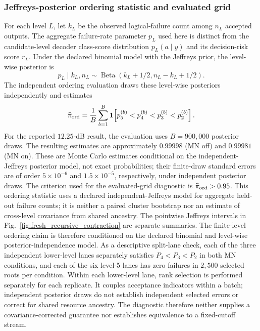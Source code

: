 \documentclass[aps,
prx,
superscriptaddress,
reprint,
longbibliography,
floatfix]{revtex4-2}
\newcounter{criterion}[section]
\begin{document}
\subsubsection{Jeffreys-posterior ordering statistic and evaluated grid}
For each level $L$, let $k_L$ be the observed logical-failure count among $n_L$ accepted outputs. The aggregate failure-rate parameter $p_L$ used here is distinct from the candidate-level decoder class-score distribution $p_L(a\mid y)$ and its decision-risk score $r_L$. Under the declared binomial model with the Jeffreys prior, the level-wise posterior is
\begin{equation}
p_L\mid k_L,n_L\sim\operatorname{Beta}(k_L+1/2,n_L-k_L+1/2).
\end{equation}
The independent ordering evaluation draws these level-wise posteriors independently and estimates
\begin{equation}
\widehat\pi_{\rm ord}=\frac{1}{B}\sum_{b=1}^{B}
\mathbf 1\!\left[p_5^{(b)}<p_4^{(b)}<p_3^{(b)}<p_2^{(b)}\right].
\end{equation}
For the reported $12.25$-dB result, the evaluation uses $B=900{,}000$ posterior draws. The resulting estimates are approximately $0.99998$ (MN off) and $0.99981$ (MN on). These are Monte Carlo estimates conditional on the independent-Jeffreys posterior model, not exact probabilities; their finite-draw standard errors are of order $5\times10^{-6}$ and $1.5\times10^{-5}$, respectively, under independent posterior draws. The criterion used for the evaluated-grid diagnostic is $\widehat\pi_{\rm ord}>0.95$. This ordering statistic uses a declared independent-Jeffreys model for aggregate held-out failure counts; it is neither a paired cluster bootstrap nor an estimate of cross-level covariance from shared ancestry. The pointwise Jeffreys intervals in Fig.~\ref{fig:fresh_recursive_contraction} are separate summaries. The finite-level ordering claim is therefore conditioned on the declared binomial and level-wise posterior-independence model. As a descriptive split-lane check, each of the three independent lower-level lanes separately satisfies $P_4<P_3<P_2$ in both MN conditions, and each of the six level-5 lanes has zero failures in $2{,}500$ selected roots per condition. Within each lower-level lane, rank selection is performed separately for each replicate. It couples acceptance indicators within a batch; independent posterior draws do not establish independent selected errors or correct for shared resource ancestry. The diagnostic therefore neither supplies a covariance-corrected guarantee nor establishes equivalence to a fixed-cutoff stream.
\end{document}
